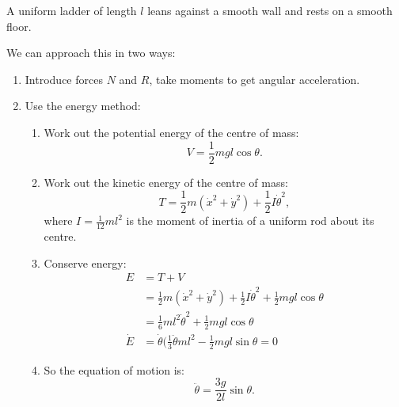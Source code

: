 \documentclass[a4paper]{article}
\begin{document}
\begin{eg}
  A uniform ladder of length $l$ leans against a smooth wall and rests on a smooth floor.
  
  \begin{center}
  \end{center}
  We can approach this in two ways:

  \begin{enumerate}
  \item Introduce forces $N$ and $R$, take moments to get angular acceleration.
  \item Use the energy method:
    \begin{enumerate}
    \item Work out the potential energy of the centre of mass: $$V = \frac{1}{2}mgl\cos\theta.$$
    \item Work out the kinetic energy of the centre of mass: $$T = \frac{1}{2}m(\dot{x}^2 + \dot{y}^2) + \frac{1}{2}I\dot{\theta}^2,$$ where $I=\frac{1}{12}ml^2$ is the moment of inertia of a uniform rod about its centre.
    \item Conserve energy:
      \begin{align*}
        E &= T + V \\
          &= \frac{1}{2}m(\dot{x}^2 + \dot{y}^2) + \frac{1}{2}I\dot{\theta}^2 + \frac{1}{2}mgl\cos\theta \\
          &= \frac{1}{6}ml^2\dot{\theta}^2 + \frac{1}{2}mgl\cos\theta \\
        \dot{E} &= \dot{\theta}(\frac{1}{3}\ddot{\theta}ml^2 - \frac{1}{2}mgl\sin\theta = 0
      \end{align*}
    \item So the equation of motion is:
      $$\ddot{\theta} = \frac{3g}{2l}\sin\theta.$$
    \end{enumerate}
  \end{enumerate}
\end{eg}
\end{document}
